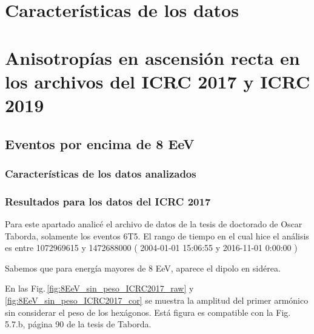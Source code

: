 

  \section{Características de los datos}

  \section{Anisotropías en ascensión recta en los archivos del ICRC 2017 y ICRC 2019}

    \subsection{Eventos por encima de 8 EeV }

      \subsubsection{Características de los datos analizados}

      \subsubsection{Resultados para los datos del ICRC 2017}

      Para este apartado analicé el archivo de datos de la tesis de doctorado de Oscar Taborda, solamente los eventos 6T5. El rango de tiempo en el cual hice  el análisis es entre 1072969615 y 1472688000 ( 2004-01-01 15:06:55 y 2016-11-01 0:00:00 )

      Sabemos que para energía mayores de 8 EeV, aparece el dipolo en sidérea.

      En las Fig.\,\ref{fig:8EeV_sin_peso_ICRC2017_raw} y \ref{fig:8EeV_sin_peso_ICRC2017_cor} se muestra la amplitud del primer armónico sin considerar el peso de los hexágonos. Está figura es compatible con la Fig. 5.7.b, página 90 de la tesis de Taborda.


